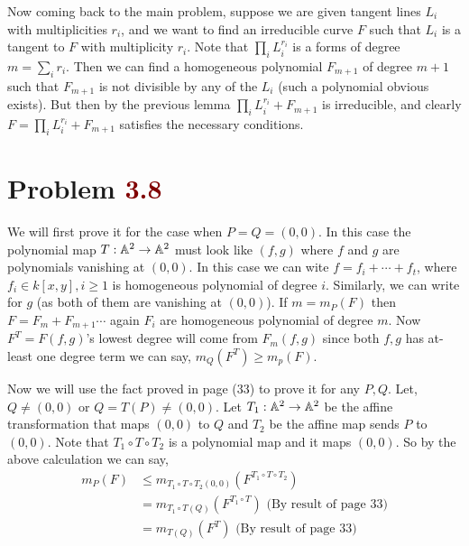 \documentclass[12pt]{article}
\begin{document}
Now coming back to the main problem, suppose we are given tangent lines $L_i$ with multiplicities $r_i$, and we want to find an irreducible curve $F$ such that $L_i$ is a tangent to $F$ with multiplicity $r_i$. Note that $\prod_i L_i^{r_i}$ is a forms of degree $m = \sum_i r_i$. Then we can find a homogeneous polynomial $F_{m+1}$ of degree $m+1$ such that $F_{m+1}$ is not divisible by any of the $L_i$ (such a polynomial obvious exists). But then by the previous lemma $\prod_i L_i^{r_i} + F_{m+1}$ is irreducible, and clearly $F = \prod_i L_i^{r_i} + F_{m+1}$ satisfies the necessary conditions.

\section{Problem \textcolor{maroon}{3.8}} %

 We will first prove it for the case when $P = Q =(0,0)$. In this case the polynomial map $T : \mathbb{A}^2 \to \mathbb{A}^2$ must look like $(f,g)$ where $f$ and $g$ are polynomials vanishing at $(0,0)$. In this case we can wite $f = f_i + \cdots + f_t$, where $f_i  \in k[x,y],i \geq 1$ is homogeneous polynomial of degree $i$. Similarly, we can write for $g$ (as both of them are vanishing at $(0,0)$). If $m = m_P(F)$ then $F = F_m +F_{m+1}\cdots$ again $F_i$ are homogeneous polynomial of degree $m$. Now $F^T = F(f,g)$'s lowest degree will come from $F_m(f,g)$ since both $f,g$ has at-least one degree term we can say, $m_Q(F^T)\geq m_p(F)$.

\vspace*{0.2cm}

Now we will use the fact proved in page (33) to prove it for any $P,Q$. Let, $Q\neq (0,0)$ or $Q = T(P)\neq (0,0)$. Let $T_1 : \mathbb{A}^2 \to \mathbb{A}^2$ be the affine transformation that maps $(0,0)$ to $Q$ and $T_2$ be the affine map sends $P$ to $(0,0)$. Note that $T_1  \circ T \circ T_2$ is a polynomial map and it maps $(0,0)$. So by the above calculation we can say, \begin{align*}
    m_P(F) & \leq m_{T_1  \circ T \circ T_2(0,0)}(F^{T_1  \circ T \circ T_2})         \\
           & = m_{T_1  \circ T (Q)}(F^{T_1  \circ T }) \text{ (By result of page 33}) \\
           & = m_{T (Q)}(F^{T }) \text{ (By result of page 33})
\end{align*}

\vspace*{0.2cm}
\end{document}
